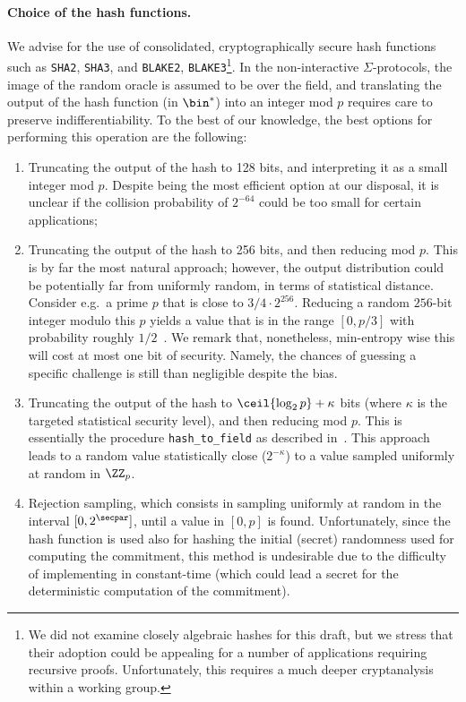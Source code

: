 \documentclass[runningheads,11pt]{article}
\begin{document}
 \paragraph{Choice of the hash functions.} We advise for the use of consolidated, cryptographically secure hash functions such as \verb|SHA2|, \verb|SHA3|, and \verb|BLAKE2|, \verb|BLAKE3|\footnote{We did not examine closely algebraic hashes for this draft, but we stress that their adoption could be appealing for a number of applications requiring recursive proofs. Unfortunately, this requires a much deeper cryptanalysis within a working group.}.
 In the non-interactive $\Sigma$-protocols, the image of the random oracle is assumed to be over the field, and translating the output of the hash function (in $\bin^*$) into an integer mod $p$ requires care to preserve indifferentiability.
To the best of our knowledge, the best options for performing this operation are the following:
\begin{enumerate}[label=$(\alph*)$]
  \item\label{item:truncate-128}  Truncating the output of the hash to 128 bits, and interpreting it as a small integer mod $p$.
  Despite being the most efficient option at our disposal, it is unclear if the collision probability of $2^{-64}$ could be too small for certain applications;
  \item\label{item:truncate-256}  Truncating the output of the hash to 256 bits, and then reducing mod $p$.
  This is by far the most natural approach; however, the output distribution could be potentially far from uniformly random, in terms of statistical distance.
 Consider e.g.\ a prime $p$ that is close to $3/4 \cdot 2^{256}$. Reducing a random $256$-bit integer modulo this $p$ yields a value that is in the range $[0, p / 3]$ with probability roughly $1/2$~\cite{hash-to-curve}.
  We remark that, nonetheless, min-entropy wise this will cost at most one bit of security.
  Namely, the chances of guessing a specific challenge is still than negligible despite the bias.
  \item\label{item:truncate-cfrg} Truncating the output of the hash to $\ceil{\log_2 p} + \kappa$ bits (where $\kappa$ is the targeted statistical
  security level), and then reducing mod $p$.
  This is essentially the procedure
  \verb|hash_to_field| as described in~\cite[Section 5]{hash-to-curve}.
  This approach leads to a random value statistically close ($2^{-\kappa}$) to a value sampled uniformly at random in $\ZZ_p$.
  \item Rejection sampling, which consists in sampling uniformly at random in the interval $[0, 2^\secpar]$, until a value in $[0, p]$ is found.
  Unfortunately, since the hash function is used also for hashing the initial (secret) randomness used for computing the commitment, this method is undesirable due to the difficulty of implementing in constant-time (which could lead a secret for the deterministic computation of the commitment).
\end{enumerate}
\end{document}
